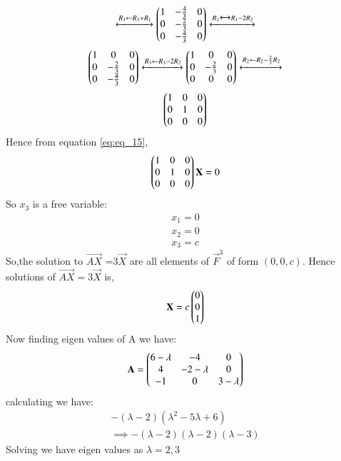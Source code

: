 \documentclass[journal,12pt,twocolumn]{IEEEtran}
\begin{document}
\begin{flushleft}
\begin{align}
    \xleftrightarrow[]{R_3 \leftarrow R_3+R_1 }
    \begin{pmatrix}1&-\frac{4}{3}&0\\
            0&-\frac{2}{3}&0\\
            0&-\frac{4}{3}&0\end{pmatrix}
    \xleftrightarrow[]{R_1 \xleftrightarrow[]{} R_1 -2R_2 } \nonumber
\end{align}
\begin{align}
    \begin{pmatrix}1&0&0\\
    0&-\frac{2}{3}&0\\
    0&-\frac{4}{3}&0\end{pmatrix}
    \xleftrightarrow[]{R_3 \leftarrow R_3-2R_2} 
    \begin{pmatrix}1&0&0\\
           0&-\frac{2}{3}&0\\
         0&0&0\end{pmatrix}   
    \xleftrightarrow[]{R_2 \leftarrow R_2-\frac{2}{3}R_2} \nonumber
\end{align}
\begin{align} \label{eq:eq_15}
    \begin{pmatrix}1&0&0\\
    0&1&0\\
    0&0&0\end{pmatrix} 
\end{align}
Hence from equation \eqref{eq:eq_15},
 \begin{align}
\begin{pmatrix}
1&0&0\\
0&1&0\\
0&0&0
 \end{pmatrix}\mathbf{X}=0
\end{align}
So $x_3$ is a free variable:
\begin{align}
  x_1=0\\
  x_2=0\\
  x_3=c
\end{align}
 So,the solution to $\vec {AX}$ =3$\vec{X}$ are all elements of $\vec{F}^3$ of form $(0,0,c)$. 
 Hence solutions of
 $\vec{AX}=3\vec{X}$ is,
 \begin{align}\label{eq:222}
 \mathbf{X} =
 c
 \begin{pmatrix}
 0\\0\\1
 \end{pmatrix}
 \end{align}
 Now finding eigen values of A we have:
\begin{align}
\mathbf{A}=
       \begin{pmatrix}6-\lambda & -4 & 0\\
             4& -2-\lambda & 0\\
             -1 &0 &3-\lambda\end{pmatrix}
\end{align}\noindent
calculating we have:
\begin{align}
-(\lambda -2)(\lambda^2 -5\lambda+6)\\
\implies -(\lambda-2)(\lambda-2)(\lambda-3)
\end{align}
Solving we have eigen values as $\lambda =2,3$

\end{flushleft}
\end{document}
